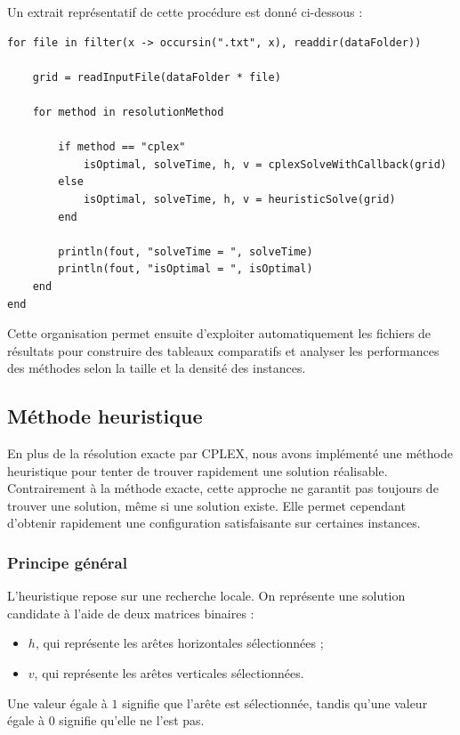 Un extrait représentatif de cette procédure est donné ci-dessous :

\begin{verbatim}
for file in filter(x -> occursin(".txt", x), readdir(dataFolder))

    grid = readInputFile(dataFolder * file)

    for method in resolutionMethod

        if method == "cplex"
            isOptimal, solveTime, h, v = cplexSolveWithCallback(grid)
        else
            isOptimal, solveTime, h, v = heuristicSolve(grid)
        end

        println(fout, "solveTime = ", solveTime)
        println(fout, "isOptimal = ", isOptimal)
    end
end
\end{verbatim}

Cette organisation permet ensuite d'exploiter automatiquement les fichiers de résultats pour construire des tableaux comparatifs et analyser les performances des méthodes selon la taille et la densité des instances.

\subsection{Méthode heuristique}

En plus de la résolution exacte par CPLEX, nous avons implémenté une méthode heuristique pour tenter de trouver rapidement une solution réalisable. Contrairement à la méthode exacte, cette approche ne garantit pas toujours de trouver une solution, même si une solution existe. Elle permet cependant d'obtenir rapidement une configuration satisfaisante sur certaines instances.

\subsubsection{Principe général}

L'heuristique repose sur une recherche locale. On représente une solution candidate à l'aide de deux matrices binaires :
\begin{itemize}
    \item \(h\), qui représente les arêtes horizontales sélectionnées ;
    \item \(v\), qui représente les arêtes verticales sélectionnées.
\end{itemize}

Une valeur égale à \(1\) signifie que l'arête est sélectionnée, tandis qu'une valeur égale à \(0\) signifie qu'elle ne l'est pas.

